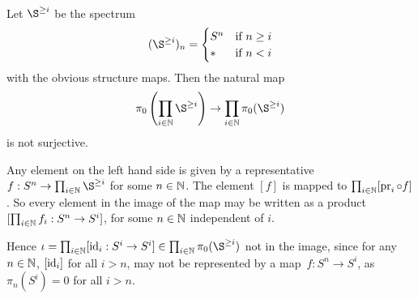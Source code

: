 

\mmaketitle

\begin{exercise}[1]\ 

Let $\S^{\ge i}$ be the spectrum 
\[ (\S^{\ge i})_n = \pwf{S^n &\tif n \ge i \\ * &\tif n < i} \]
with the obvious structure maps. 
Then the natural map 
\[ \pi_0\left( \prod_{i\in\N} \S^{\ge i} \right) \to 
    \prod_{i\in\N} \pi_0(\S^{\ge i}) \]
is not surjective.

Any element on the left hand side is given by a representative 
$f : S^n \to \prod_{i\in\N} \S^{\ge i}$ for some $n \in \mathbb{N}$.
The element $[f]$ is mapped to $\prod_{i\in\mathbb{N}} [\operatorname{pr}_i \circ f]$. So every
element in the image of the map may be written as a product $[\prod_{i\in\mathbb{N}}
f_i : S^n \to S^i]$, for some $n\in \mathbb{N}$ independent of $i$.

Hence $\iota = \prod_{i\in\N} [\id_i : S^i \to S^i] \in \prod_{i\in\N}
\pi_0(\S^{\ge i})$ not in the image, since for any $n\in \mathbb{N}$, $[\operatorname{id}_i]$ for
all $i > n$, may not be represented by a map $f : S^n \to S^i$, as $\pi_n(S^i)
= 0$ for all $i > n$.
\end{exercise}

\begin{exercise}[2]\ 

\end{exercise}

